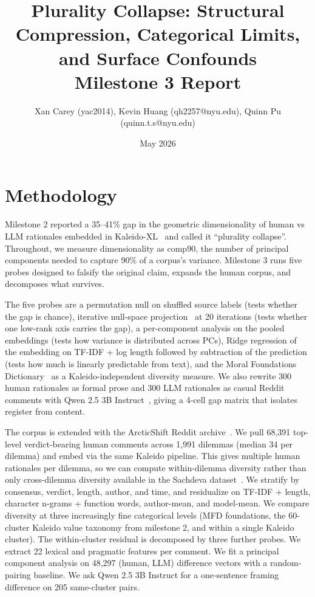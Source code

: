 \documentclass[11pt,a4paper]{article}
\title{Plurality Collapse: Structural Compression, Categorical Limits, and Surface Confounds\\[0.3em]\large Milestone 3 Report}
\author{Xan Carey (yac2014), Kevin Huang (qh2257@nyu.edu), Quinn Pu (quinn.t.s@nyu.edu)}
\date{May 2026}
\begin{document}
\maketitle
\vspace{-1em}

\section{Methodology}

Milestone 2 reported a 35--41\% gap in the geometric dimensionality of human vs LLM rationales embedded in Kaleido-XL~\cite{sorensen2024kaleido} and called it ``plurality collapse''. Throughout, we measure dimensionality as comp90, the number of principal components needed to capture 90\% of a corpus's variance. Milestone 3 runs five probes designed to falsify the original claim, expands the human corpus, and decomposes what survives.

The five probes are a permutation null on shuffled source labels (tests whether the gap is chance), iterative null-space projection~\cite{ravfogel2020inlp} at 20 iterations (tests whether one low-rank axis carries the gap), a per-component analysis on the pooled embeddings (tests how variance is distributed across PCs), Ridge regression of the embedding on TF-IDF + log length followed by subtraction of the prediction (tests how much is linearly predictable from text), and the Moral Foundations Dictionary~\cite{graham2009moral} as a Kaleido-independent diversity measure. We also rewrite 300 human rationales as formal prose and 300 LLM rationales as casual Reddit comments with Qwen 2.5 3B Instruct~\cite{qwen2025}, giving a 4-cell gap matrix that isolates register from content.

The corpus is extended with the ArcticShift Reddit archive~\cite{arcticshift}. We pull 68,391 top-level verdict-bearing human comments across 1,991 dilemmas (median 34 per dilemma) and embed via the same Kaleido pipeline. This gives multiple human rationales per dilemma, so we can compute within-dilemma diversity rather than only cross-dilemma diversity available in the Sachdeva dataset~\cite{sachdeva2025dilemmas}. We stratify by consensus, verdict, length, author, and time, and residualize on TF-IDF + length, character n-grams + function words, author-mean, and model-mean. We compare diversity at three increasingly fine categorical levels (MFD foundations, the 60-cluster Kaleido value taxonomy from milestone 2, and within a single Kaleido cluster). The within-cluster residual is decomposed by three further probes. We extract 22 lexical and pragmatic features per comment. We fit a principal component analysis on 48,297 (human, LLM) difference vectors with a random-pairing baseline. We ask Qwen 2.5 3B Instruct for a one-sentence framing difference on 205 same-cluster pairs.
\end{document}
